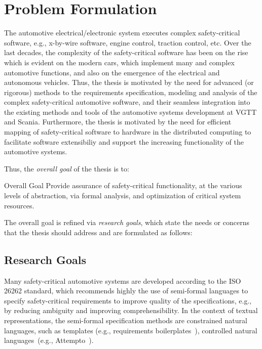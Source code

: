 \chapter{Problem Formulation}
The automotive electrical/electronic system executes complex safety-critical software, e.g., x-by-wire software, engine control, traction control, etc. Over the last decades, the complexity of the safety-critical software has been on the rise which is evident on the modern cars, which implement many and complex automotive functions, and also on the emergence of the electrical and autonomous vehicles. Thus, the thesis is motivated by the need for advanced (or rigorous) methods to the requirements specification, modeling and analysis of the complex safety-critical automotive software, and their seamless integration into the existing methods and tools of the automotive systems development at VGTT and Scania. Furthermore, the thesis is motivated by the need for efficient mapping of safety-critical software to hardware in the distributed computing to facilitate software extensibiliy and support the increasing functionality of the automotive systems. 

Thus, the \textit{overall goal} of the thesis is to:
\begin{mybox}[attach title to upper={\ ---\ }]{Overall Goal}
	Provide assurance of safety-critical functionality, at the various levels of abstraction, via formal analysis, and optimization of critical system resources.
\end{mybox}

The overall goal is refined via \textit{research goals}, which state the needs or concerns that the thesis should address and are formulated as follows:

\section{Research Goals}\label{research_challenges}
Many safety-critical automotive systems are developed according to the ISO 26262 standard, which recommends highly the use of semi-formal languages to specify safety-critical requirements to improve quality of the specifications, e.g., by reducing ambiguity and improving comprehensibility. In the context of textual representations, the semi-formal specification methods are constrained natural languages, such as templates (e.g., requirements boilerplates~\cite{Farfeleder2011DODT:Development}\cite{Mahmud2015ReSA:Systems}), controlled natural languages~\cite{Kuhn2014ALanguages}(e.g., Attempto~\cite{attempto96}).

